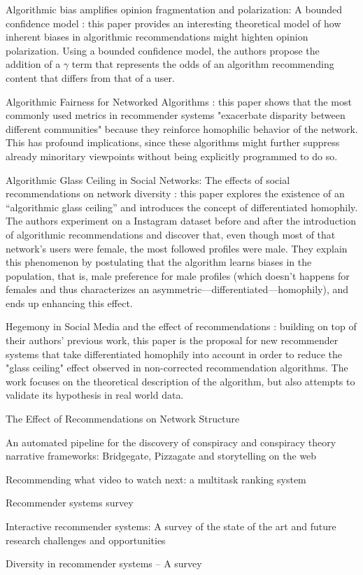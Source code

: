 Algorithmic bias amplifies opinion fragmentation and polarization: A bounded
confidence model \citet{sirbu_algorithmic_2019}: this paper provides an
interesting theoretical model of how inherent biases in algorithmic
recommendations might highten opinion polarization. Using a bounded confidence
model, the authors propose the addition of a $\gamma$ term that represents the
odds of an algorithm recommending content that differs from that of a user.

Algorithmic Fairness for Networked Algorithms \citet{stoica_algorithmic_2020}:
this paper shows that the most commonly used metrics in recommender systems
"exacerbate disparity between different communities" because they reinforce
homophilic behavior of the network. This has profound implications, since these
algorithms might further suppress already minoritary viewpoints without being
explicitly programmed to do so.

Algorithmic Glass Ceiling in Social Networks: The effects of social
recommendations on network diversity \citet{stoica_algorithmic_2018}: this paper
explores the existence of an ``algorithmic glass ceiling'' and introduces the
concept of differentiated homophily. The authors experiment on a Instagram
dataset before and after the introduction of algorithmic recommendations and
discover that, even though most of that network's users were female, the most
followed profiles were male. They explain this phenomenon by postulating that
the algorithm learns biases in the population, that is, male preference for male
profiles (which doesn't happens for females and thus characterizes an
asymmetric---differentiated---homophily), and ends up enhancing this effect.

Hegemony in Social Media and the effect of recommendations
\citet{stoica_hegemony_2019}: building on top of their authors' previous work,
this paper is the proposal for new recommender systems that take differentiated
homophily into account in order to reduce the "glass ceiling" effect observed in
non-corrected recommendation algorithms. The work focuses on the theoretical
description of the algorithm, but also attempts to validate its hypothesis in
real world data.

The Effect of Recommendations on Network Structure \citet{su_effect_2016}

An automated pipeline for the discovery of conspiracy and conspiracy theory
narrative frameworks: Bridgegate, Pizzagate and storytelling on the web
\citet{tangherlini_automated_2020}

Recommending what video to watch next: a multitask ranking system
\citet{zhao_recommending_2019}





Recommender systems survey \citet{bobadilla_recommender_2013}

Interactive recommender systems: A survey of the state of the art and future
research challenges and opportunities \citet{he_interactive_2016}

Diversity in recommender systems – A survey \citet{kunaver_diversity_2017}
